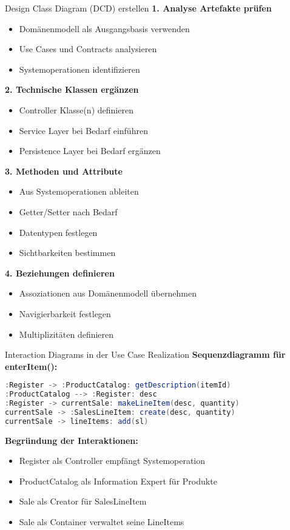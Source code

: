 \begin{KR}{Design Class Diagram (DCD) erstellen}
\textbf{1. Analyse Artefakte prüfen}
\begin{itemize}
    \item Domänenmodell als Ausgangsbasis verwenden
    \item Use Cases und Contracts analysieren
    \item Systemoperationen identifizieren
\end{itemize}

\textbf{2. Technische Klassen ergänzen}
\begin{itemize}
    \item Controller Klasse(n) definieren
    \item Service Layer bei Bedarf einführen
    \item Persistence Layer bei Bedarf ergänzen
\end{itemize}

\textbf{3. Methoden und Attribute}
\begin{itemize}
    \item Aus Systemoperationen ableiten
    \item Getter/Setter nach Bedarf
    \item Datentypen festlegen
    \item Sichtbarkeiten bestimmen
\end{itemize}

\textbf{4. Beziehungen definieren}
\begin{itemize}
    \item Assoziationen aus Domänenmodell übernehmen
    \item Navigierbarkeit festlegen
    \item Multiplizitäten definieren
\end{itemize}
\end{KR}

\begin{example2}{Interaction Diagrams in der Use Case Realization}
\textbf{Sequenzdiagramm für enterItem():}

\begin{lstlisting}[language=Java, style=basesmol]
:Register -> :ProductCatalog: getDescription(itemId)
:ProductCatalog --> :Register: desc
:Register -> currentSale: makeLineItem(desc, quantity)
currentSale -> :SalesLineItem: create(desc, quantity)
currentSale -> lineItems: add(sl)
\end{lstlisting}

\textbf{Begründung der Interaktionen:}
\begin{itemize}
    \item Register als Controller empfängt Systemoperation
    \item ProductCatalog als Information Expert für Produkte
    \item Sale als Creator für SalesLineItem
    \item Sale als Container verwaltet seine LineItems
\end{itemize}
\end{example2}

